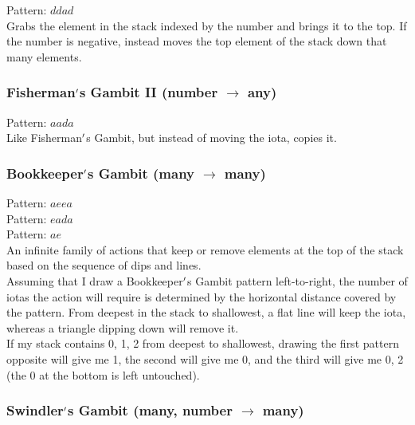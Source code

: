 \documentclass[12pt]{article}
\begin{document}
    Pattern: $ddad$\\
      Grabs the element in the stack indexed by the number and brings it to the top. If the number is negative, instead moves the top element of the stack down that many elements.\\


  \label{sec: patterns/stackmanip@hexcasting:fisherman/copy}
\subsubsection*{Fisherman$\rq$s Gambit II (number $\rightarrow$ any)}

    Pattern: $aada$\\
      Like Fisherman$\rq$s Gambit, but instead of moving the iota, copies it.\\


  \label{sec: patterns/stackmanip@hexcasting:mask}
\subsubsection*{Bookkeeper$\rq$s Gambit (many $\rightarrow$ many)}

    Pattern: $aeea$\\
    Pattern: $eada$\\
    Pattern: $ae$\\
      An infinite family of actions that keep or remove elements at the top of the stack based on the sequence of dips and lines.\\


  
    Assuming that I draw a Bookkeeper$\rq$s Gambit pattern left-to-right, the number of iotas the action will require is determined by the horizontal distance covered by the pattern. From deepest in the stack to shallowest, a flat line will keep the iota, whereas a triangle dipping down will remove it.\\If my stack contains 0, 1, 2 from deepest to shallowest, drawing the first pattern opposite will give me 1, the second will give me 0, and the third will give me 0, 2 (the 0 at the bottom is left untouched).\\


  \label{sec: patterns/stackmanip@hexcasting:swizzle}
\subsubsection*{Swindler$\rq$s Gambit (many, number $\rightarrow$ many)}
\end{document}

